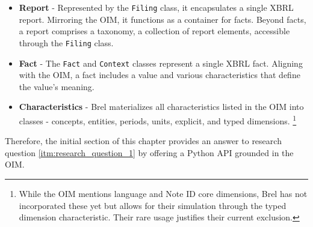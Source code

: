 
\begin{itemize}
    \item \textbf{Report} - Represented by the \texttt{Filing} class, it encapsulates a single XBRL report.
    Mirroring the OIM, it functions as a container for facts.
    Beyond facts, a report comprises a taxonomy, a collection of report elements, accessible through the \texttt{Filing} class.
    \item \textbf{Fact} - The \texttt{Fact} and \texttt{Context} classes represent a single XBRL fact.
    Aligning with the OIM, a fact includes a value and various characteristics that define the value's meaning.
    \item \textbf{Characteristics} - Brel materializes all characteristics listed in the OIM into classes - concepts, entities, periods, units, explicit, and typed dimensions.
    \footnote{While the OIM mentions language and Note ID core dimensions, Brel has not incorporated these yet but allows for their simulation through the typed dimension characteristic. Their rare usage justifies their current exclusion.}
\end{itemize}

Therefore, the initial section of this chapter provides an answer to 
research question \ref{itm:research_question_1} by offering a Python API grounded in the OIM.

